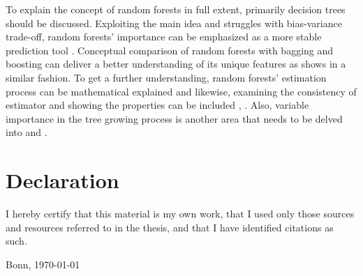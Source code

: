 \documentclass[ twoside=false, 12pt,  footinclude=true,  headinclude=true,  cleardoublepage=empty]{scrbook}
\begin{document}
To explain the concept of random forests in full extent, primarily decision trees should be discussed. Exploiting the main idea and struggles with bias-variance trade-off, random forests' importance can be emphasized as a more stable prediction tool \cite{maimon2005data}. Conceptual comparison of random forests with bagging and boosting can deliver a better understanding of its unique features as \cite{lee2019bootstrap} shows in a similar fashion. To get a further understanding, random forests’ estimation process can be mathematical explained \cite{biau2012analysis} and likewise, examining the consistency of estimator and showing the properties can be included \cite{breiman2004consistency}, \cite{denil2014narrowing}. Also, variable importance in the tree growing process is another area that needs to be delved into \cite{ishwaran2007variable} and \cite{louppe2013understanding}.



\mainmatter











\printbibliography


\chapter*{Declaration}
I hereby certify that this material is my own work, that I used only those sources and resources referred to in the thesis, and that I have identified citations as such.
		
\vspace{0.3in}

\noindent Bonn, \today
\end{document}
